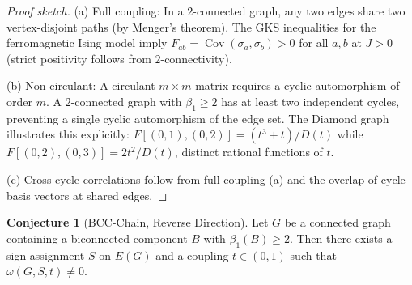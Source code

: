\documentclass[11pt]{article}
\theoremstyle{definition}
\newtheorem{conjecture}[theorem]{Conjecture}
\theoremstyle{remark}
\newcommand{\Fish}{F}
\newcommand{\vort}{\omega}
\newcommand{\Cov}{\operatorname{Cov}}
\newcommand{\edgeo}{\sigma}
\newcommand{\betti}{\beta_1}
\begin{document}
\begin{proof}[Proof sketch]
(a) Full coupling: In a $2$-connected graph, any two edges share two
vertex-disjoint paths (by Menger's theorem). The GKS inequalities
for the ferromagnetic Ising model imply $\Fish_{ab} = \Cov(\edgeo_a, \edgeo_b) > 0$
for all $a, b$ at $J > 0$ (strict positivity follows from $2$-connectivity).

(b) Non-circulant: A circulant $m \times m$ matrix requires a cyclic automorphism
of order $m$. A $2$-connected graph with $\betti \geq 2$ has at least two
independent cycles, preventing a single cyclic automorphism of the edge set.
The Diamond graph illustrates this explicitly: $\Fish[(0{,}1),(0{,}2)]
= (t^3+t)/D(t)$ while $\Fish[(0{,}2),(0{,}3)] = 2t^2/D(t)$, distinct rational
functions of $t$.

(c) Cross-cycle correlations follow from full coupling (a) and the overlap
of cycle basis vectors at shared edges.
\end{proof}

\begin{conjecture}[BCC-Chain, Reverse Direction]
\label{thm:bcc-reverse}
Let $G$ be a connected graph containing a biconnected component $B$
with $\betti(B) \geq 2$. Then there exists a sign assignment $S$ on
$E(G)$ and a coupling $t \in (0,1)$ such that $\vort(G, S, t) \neq 0$.
\end{conjecture}
\end{document}

